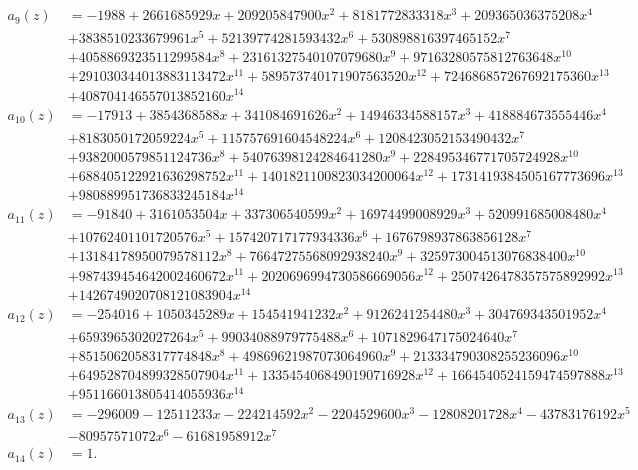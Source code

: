 \documentclass[reqno]{amsart}
\theoremstyle{definition}
\theoremstyle{remark}
\numberwithin{equation}{section}
\begin{document}
\begin{align*}
a_9(z)
&=-1988 + 2661685929 x + 209205847900 x^2 + 8181772833318 x^3 + 209365036375208 x^4\\
&+ 3838510233679961 x^5 + 52139774281593432 x^6 + 530898816397465152 x^7\\
&+ 4058869323511299584 x^8 + 23161327540107079680 x^9 + 97163280575812763648 x^{10}\\
&+ 291030344013883113472 x^{11} + 589573740171907563520 x^{12} + 724686857267692175360 x^{13}\\
&+ 408704146557013852160 x^{14}\\
a_{10}(z)
&=-17913 + 3854368588 x + 341084691626 x^2 + 14946334588157 x^3 + 418884673555446 x^4\\
&+ 8183050172059224 x^5 + 115757691604548224 x^6 + 1208423052153490432 x^7\\
&+ 9382000579851124736 x^8 + 54076398124284641280 x^9 + 228495346771705724928 x^{10}\\
&+ 688405122921636298752 x^{11} + 1401821100823034200064 x^{12} + 1731419384505167773696 x^{13}\\ 
&+ 980889951736833245184 x^{14}\\
a_{11}(z)
&=-91840 + 3161053504 x + 337306540599 x^2 + 16974499008929 x^3 + 520991685008480 x^4\\
&+ 10762401101720576 x^5 + 157420717177934336 x^6 + 1676798937863856128 x^7\\
&+ 13184178950079578112 x^8 + 76647275568092938240 x^9 + 325973004513076838400 x^{10}\\
&+ 987439454642002460672 x^{11} + 2020696994730586669056 x^{12} + 2507426478357575892992 x^{13}\\
&+ 1426749020708121083904 x^{14}\\
a_{12}(z)
&=-254016 + 1050345289 x + 154541941232 x^2 + 9126241254480 x^3 + 304769343501952 x^4\\
&+ 6593965302027264 x^5 + 99034088979775488 x^6 + 1071829647175024640 x^7\\
&+ 8515062058317774848 x^8 + 49869621987073064960 x^9 + 213334790308255236096 x^{10}\\
&+ 649528704899328507904 x^{11} + 1335454068490190716928 x^{12} + 1664540524159474597888 x^{13}\\
&+ 951166013805414055936 x^{14}\\
a_{13}(z)
&=-296009 - 12511233 x - 224214592 x^2 - 2204529600 x^3 - 12808201728 x^4 - 43783176192 x^5\\
&- 80957571072 x^6 - 61681958912 x^7\\
a_{14}(z) &= 1.
\end{align*}
\end{document}

